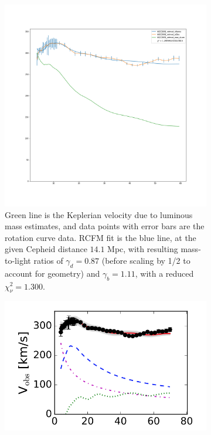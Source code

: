 \documentclass[reprint,%
 amsmath,amssymb,
 aps,
]{revtex4-1}
\begin{document}
 \begin{figure}[ht] 
  \begin{subfigure}[b]{0.5\linewidth}
    \centering
    \includegraphics[width=0.95\linewidth]{figures/NGC2841_rotmod_XueSofue.png} 
    \caption{ Green line is the Keplerian velocity due to  luminous mass estimates, and data points with error bars are the rotation curve data.
    RCFM fit is the blue line,   at the 
    given Cepheid distance $14.1$ Mpc, with resulting mass-to-light ratios of $\gamma_d =0.87 $ (before scaling by 1/2 to account for geometry)  and $\gamma_b =1.11$, with a reduced  $\chi^2_\nu = 1.300$.  } 
    \label{fig:ngc2841RCFMfit} 
    \vspace{4ex}
  \end{subfigure}%
  \begin{subfigure}[b]{0.5\linewidth}
    \centering
    \includegraphics[width=0.95\linewidth]{figures/NGC2841_RarResults_Li2018}

\end{subfigure}
\end{figure}
\end{document}
